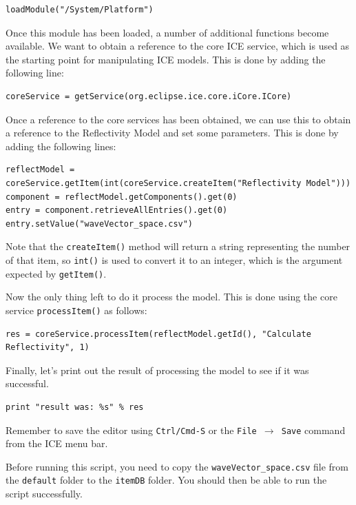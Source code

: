 \lstset{basicstyle=\ttfamily\small, breaklines}

{\small
\begin{verbatim}
loadModule("/System/Platform")
\end{verbatim}
}

Once this module has been loaded, a number of additional functions become
available. We want to obtain a reference to the core ICE service, which is used
as the starting point for manipulating ICE models. This is done by adding the
following line:

{\small
\begin{verbatim}
coreService = getService(org.eclipse.ice.core.iCore.ICore)
\end{verbatim}
}

Once a reference to the core services has been obtained, we can use this to
obtain a reference to the Reflectivity Model and set some parameters. This is
done by adding the following lines:

{\small
\begin{verbatim}
reflectModel = coreService.getItem(int(coreService.createItem("Reflectivity Model")))
component = reflectModel.getComponents().get(0)
entry = component.retrieveAllEntries().get(0)
entry.setValue("waveVector_space.csv")
\end{verbatim}
}

Note that the \texttt{createItem()} method will return a string representing the
number of that item, so \texttt{int()} is used to convert it to an integer, which is the
argument expected by \texttt{getItem()}.

Now the only thing left to do it process the model. This is done using the core
service \texttt{processItem()} as follows:

{\small
\begin{verbatim}
res = coreService.processItem(reflectModel.getId(), "Calculate Reflectivity", 1)
\end{verbatim}
}

Finally, let's print out the result of processing the model to see if it was
successful.

{\small
\begin{verbatim}
print "result was: %s" % res
\end{verbatim}
}

Remember to save the editor using \texttt{Ctrl/Cmd-S} or the \texttt{File
$\rightarrow$ Save} command from the ICE menu bar.

Before running this script, you need to copy the \texttt{waveVector\_space.csv}
file from the \texttt{default} folder to the \texttt{itemDB} folder. You should
then be able to run the script successfully.


